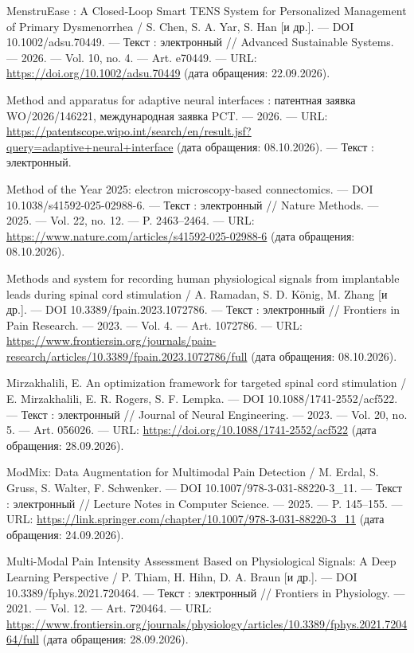 \begin{list}{}{\setlength{\leftmargin}{10mm}\setlength{\labelwidth}{8mm}\setlength{\labelsep}{2mm}\setlength{\itemsep}{0pt}\setlength{\parsep}{0pt}\setlength{\topsep}{0pt}}
\item[184.] MenstruEase : A Closed‐Loop Smart TENS System for Personalized Management of Primary Dysmenorrhea / S. Chen, S. A. Yar, S. Han [и др.]. — DOI 10.1002/adsu.70449. — Текст : электронный // Advanced Sustainable Systems. — 2026. — Vol. 10, no. 4. — Art. e70449. — URL: \url{https://doi.org/10.1002/adsu.70449} (дата обращения: 22.09.2026).
\item[185.] Method and apparatus for adaptive neural interfaces : патентная заявка WO/2026/146221, международная заявка PCT. — 2026. — URL: \url{https://patentscope.wipo.int/search/en/result.jsf?query=adaptive+neural+interface} (дата обращения: 08.10.2026). — Текст : электронный.
\item[186.] Method of the Year 2025: electron microscopy-based connectomics. — DOI 10.1038/s41592-025-02988-6. — Текст : электронный // Nature Methods. — 2025. — Vol. 22, no. 12. — P. 2463–2464. — URL: \url{https://www.nature.com/articles/s41592-025-02988-6} (дата обращения: 08.10.2026).
\item[187.] Methods and system for recording human physiological signals from implantable leads during spinal cord stimulation / A. Ramadan, S. D. König, M. Zhang [и др.]. — DOI 10.3389/fpain.2023.1072786. — Текст : электронный // Frontiers in Pain Research. — 2023. — Vol. 4. — Art. 1072786. — URL: \url{https://www.frontiersin.org/journals/pain-research/articles/10.3389/fpain.2023.1072786/full} (дата обращения: 08.10.2026).
\item[188.] Mirzakhalili, E. An optimization framework for targeted spinal cord stimulation / E. Mirzakhalili, E. R. Rogers, S. F. Lempka. — DOI 10.1088/1741-2552/acf522. — Текст : электронный // Journal of Neural Engineering. — 2023. — Vol. 20, no. 5. — Art. 056026. — URL: \url{https://doi.org/10.1088/1741-2552/acf522} (дата обращения: 28.09.2026).
\item[189.] ModMix: Data Augmentation for Multimodal Pain Detection / M. Erdal, S. Gruss, S. Walter, F. Schwenker. — DOI 10.1007/978-3-031-88220-3\_11. — Текст : электронный // Lecture Notes in Computer Science. — 2025. — P. 145–155. — URL: \url{https://link.springer.com/chapter/10.1007/978-3-031-88220-3\_11} (дата обращения: 24.09.2026).
\item[190.] Multi-Modal Pain Intensity Assessment Based on Physiological Signals: A Deep Learning Perspective / P. Thiam, H. Hihn, D. A. Braun [и др.]. — DOI 10.3389/fphys.2021.720464. — Текст : электронный // Frontiers in Physiology. — 2021. — Vol. 12. — Art. 720464. — URL: \url{https://www.frontiersin.org/journals/physiology/articles/10.3389/fphys.2021.720464/full} (дата обращения: 28.09.2026).

\end{list}
